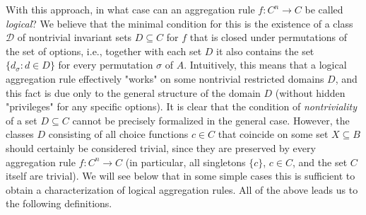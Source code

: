 \documentclass[graybox]{SNmult}
\theoremstyle{definition}
\begin{document}
\par With this approach, in what case can an aggregation rule $f: C^n\to C$ be called \textit{logical}? We believe that the minimal condition for this is the existence of a class $\mathscr D$ of nontrivial invariant sets $D\subseteq C$ for $f$ that is closed under permutations of the set of options, i.e., together with each set $D$ it also contains the set $\{d_\sigma: d\in D\}$ for every permutation $\sigma$ of $A$. Intuitively, this means that a logical aggregation rule effectively "works" on some nontrivial restricted domains $D$, and this fact is due only to the general structure of the domain $D$ (without hidden "privileges" for any specific options). It is clear that the condition of \textit{nontriviality} of a set $D\subseteq C$ cannot be precisely formalized in the general case. However, the classes $D$ consisting of all choice functions $c\in C$ that coincide on some set $X\subseteq B$ should certainly be considered trivial, since they are preserved by every aggregation rule $f: C^n\to C$ (in particular, all singletons $\{c\}$, $c\in C$, and the set $C$ itself are trivial). We will see below that in some simple cases this is sufficient to obtain a characterization of logical aggregation rules. All of the above leads us to the following definitions.
\end{document}
